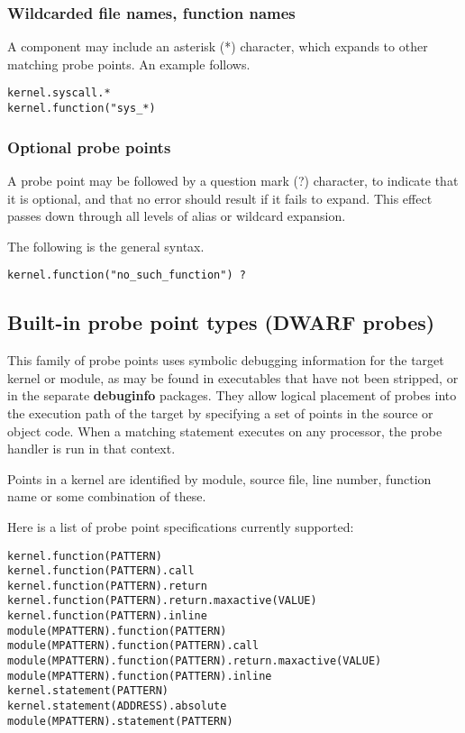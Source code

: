\documentclass[twoside,english]{article}
\newenvironment{vindent}
{\begin{list}{}{\setlength{\listparindent}{6pt}}
\item[]}
{\end{list}}
\begin{document}
\subsubsection{Wildcarded file names, function names}
A component may include an asterisk ({*}) character, which expands to other
matching probe points. An example follows.

\begin{vindent}
\begin{verbatim}
kernel.syscall.*
kernel.function("sys_*)
\end{verbatim}
\end{vindent}

\subsubsection{Optional probe points\label{sub:Optional-probe-points}}
A probe point may be followed by a question mark (?) character, to indicate
that it is optional, and that no error should result if it fails to expand.
This effect passes down through all levels of alias or wildcard expansion.

The following is the general syntax.

\begin{vindent}
\begin{verbatim}
kernel.function("no_such_function") ?
\end{verbatim}
\end{vindent}

\subsection{Built-in probe point types (DWARF probes)}
This family of probe points uses symbolic debugging information for the target
kernel or module, as may be found in executables that have not
been stripped, or in the separate \textbf{debuginfo} packages. They allow
logical placement of probes into the execution path of the target 
by specifying a set of points in the source or object code. When a matching
statement executes on any processor, the probe handler is run in that context.

Points in a kernel are identified by module, source file, line number, function
name or some combination of these.

Here is a list of probe point specifications currently supported: 

\begin{vindent}
\begin{verbatim}
kernel.function(PATTERN)
kernel.function(PATTERN).call
kernel.function(PATTERN).return
kernel.function(PATTERN).return.maxactive(VALUE)
kernel.function(PATTERN).inline
module(MPATTERN).function(PATTERN)
module(MPATTERN).function(PATTERN).call
module(MPATTERN).function(PATTERN).return.maxactive(VALUE)
module(MPATTERN).function(PATTERN).inline
kernel.statement(PATTERN)
kernel.statement(ADDRESS).absolute
module(MPATTERN).statement(PATTERN)
\end{verbatim}
\end{vindent}
\end{document}
